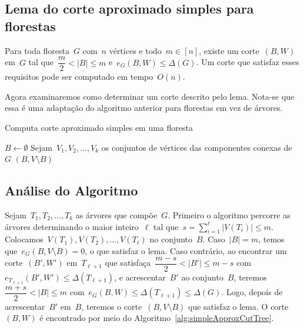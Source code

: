 \bigskip
\bigskip
\bigskip


\subsection{Lema do corte aproximado simples para florestas}

\begin{lem}
\label{lema:simpleApproxCutForest}
	Para toda floresta~$G$ com~$n$ vértices e todo~${m \in [n]}$,
	existe um corte~$(B,W)$ em~$G$ tal 
	que~${\dfrac{m}{2} <|B| \le m}$ e~${e_G(B,W) \le \Delta(G)}$.
	Um corte que satisfaz esses requisitos pode ser computado em
	tempo~$O(n)$.
\end{lem}

\bigskip

Agora examinaremos como determinar um corte descrito pelo lema.
Nota-se que essa é uma adaptação do algoritmo anterior
para florestas em vez de árvores.

\medskip
\medskip

\begin{algorithm}[H]
\label{alg:simpleApproxCutForest}

	\caption{Computa corte aproximado simples em uma floresta}
	$B \gets \emptyset$\;
	Sejam~$V_1, V_2,\ldots, V_k$ os conjuntos de vértices das
	componentes conexas de~$G$\;
	\Return $(B,V\setminus B)$\;

\end{algorithm}	

\bigskip

\subsection*{Análise do Algoritmo}

	Sejam~${T_1, T_2, \ldots,T_k}$ as árvores que compõe~$G$. 
	Primeiro o algoritmo percorre as árvores determinando
	o maior inteiro~$\ell$ tal 
	que~${s=\displaystyle\sum_{i=1}^{\ell}|V(T_i)| \le m}$.
	Colocamos~${V(T_1),V(T_2), \ldots,V(T_\ell)}$ no conjunto~$B$.
	Caso~${|B|=m}$, temos que~${e_G(B,V\setminus B)=0}$, o que 
	satisfaz o lema.
	Caso contrário, ao encontrar um corte~$(B',W')$ em~$T_{\ell+1}$
	que satisfaça~${\dfrac{m-s}{2}<|B'|\le m-s}$ 
	com~${e_{T_{\ell+1}}(B',W') \le \Delta(T_{\ell+1})}$, e 
	acrescentar~$B'$ ao conjunto~$B$, 
	teremos~${\dfrac{m+s}{2}<|B| \le m}$ 
	com~${e_G(B,W)\le\Delta(T_{\ell+1}) \le \Delta(G)}$.
	Logo, depois de acrescentar~$B'$ em~$B$, teremos o 
	corte~${(B,V\setminus B)}$ que satisfaz o lema.
	O corte~$(B,W)$ é encontrado por meio do 
	Algoritmo~\ref{alg:simpleApproxCutTree}.


